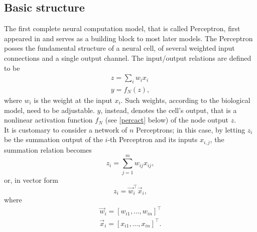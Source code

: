 \documentclass[%
    corpo=11pt,
    twoside,
    stile=classica,
    oldstyle,
    autoretitolo,
    tipotesi=magistrale,
    greek,
    evenboxes,
    english
]{toptesi}
\begin{document}
\subsection{Basic structure}
\label{percbs}
The first complete neural computation model, that is called Perceptron, first appeared in \citep{rosenblatt} and serves as a building block to most later models. The Perceptron posses the fundamental structure of a neural cell, of several weighted input connections and a single output channel. The input/output relations are defined to be
\begin{align}
z = \sum_{i}w_i x_i \\
y = f_N(z),
\end{align}
where $w_i$ is the weight at the input $x_i$. Such weights, according to the biological model, need to be adjustable. $y$, instead, denotes the cell's output, that is a nonlinear activation function $f_N$ (see \ref{percact} below) of the node output $z$. \\
It is customary to consider a network of $n$ Perceptrons; in this case, by letting $z_i$ be the summation output of the $i$-th Perceptron and its inputs $x_{i,j}$, the summation relation becomes
\begin{equation}
z_i = \sum_{j=1}^{m}w_{ij} x_{ij}, 
\end{equation}
or, in vector form 
\begin{equation}
\label{percout}
z_i = \vec{w}_i^{\intercal}\vec{x}_i,
\end{equation}
where
\begin{align*}
\vec{w}_i = \left[w_{i1}, \dots, w_{in} \right]^\intercal \\
\vec{x}_i = \left[x_{i1}, \dots, x_{in} \right]^\intercal.
\end{align*}
\end{document}
